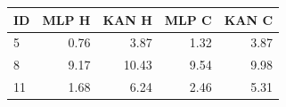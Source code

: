 \begin{center}
\small
\setlength{\tabcolsep}{4pt}
\begin{tabular}{@{}lrrrr@{}}
\toprule
ID & MLP H & KAN H & MLP C & KAN C\\
\midrule
5 & 0.76 & 3.87 & 1.32 & 3.87\\
8 & 9.17 & 10.43 & 9.54 & 9.98\\
11 & 1.68 & 6.24 & 2.46 & 5.31\\
\bottomrule
\end{tabular}
\end{center}